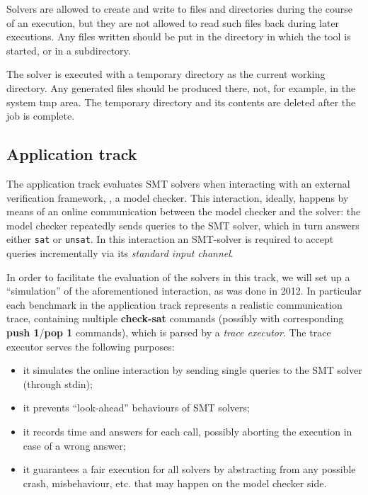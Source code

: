 \documentclass[12pt]{article}
\newcommand{\akey}[1]{\textbf{#1}}
\begin{document}
Solvers are allowed to create and write to
files and directories during the course of an execution, but they are
not allowed to read such files back during later executions.  Any
files written should be put in the directory in which the tool is
started, or in a subdirectory.

The solver is executed with a temporary directory as the current working directory.
Any generated files should be produced there, not, for example, in the system tmp area.
The temporary directory and its contents are deleted after the job is complete.

\subsection{Application track}
\label{sec:exec:application}

The application track evaluates SMT solvers when interacting
with an external verification framework, \eg, a model
checker. This interaction, ideally, happens by means of an online
communication between the model checker and the solver: the model
checker repeatedly sends queries to the SMT solver, which in turn
answers either \texttt{sat} or \texttt{unsat}.  In this interaction an SMT-solver is
required to accept queries incrementally via its {\em standard input channel}.

In order to facilitate the evaluation of the solvers in this track, we
will set up a ``simulation'' of the aforementioned interaction, as was done in 2012. In
particular each benchmark in the application track represents a realistic
communication trace, containing multiple \akey{check-sat} commands (possibly
with corresponding \akey{push 1}/\akey{pop 1} commands), which
is parsed by a {\em trace executor}. The trace executor serves the following purposes:
\begin{itemize}
\item it simulates the online interaction by sending single queries to the SMT solver
      (through stdin);
\item it prevents ``look-ahead'' behaviours of SMT solvers;
\item it records time and answers for each call, possibly aborting the execution
      in case of a wrong answer;
\item it guarantees a fair execution for all solvers by abstracting from any possible
      crash, misbehaviour, etc. that may happen on the model checker side.
\end{itemize}
\end{document}

